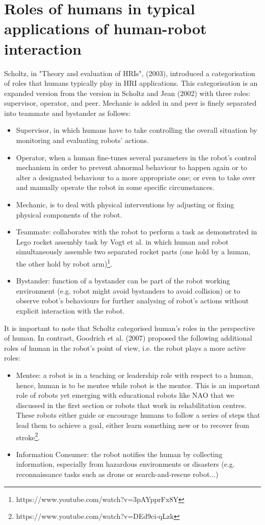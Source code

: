 \documentclass[10pt, a4paper]{article}
\begin{document}
\section{Roles of humans in typical applications of human-robot interaction}
Scholtz, in "Theory and evaluation of HRIs", (2003)\cite{scholtz2003theory}, introduced a categorisation of roles that humans typically play in HRI applications. This categorisation is an expanded version from the version in Scholtz and Jean (2002)\cite{scholtz2002human} with three roles:  supervisor, operator, and peer. Mechanic is added in and peer is finely separated into teammate and bystander as follows:
\begin{itemize}
	\item Supervisor, in which humans have to take controlling the overall situation by monitoring and evaluating robots' actions.
	\item Operator, when a human fine-tunes several parameters in the robot's control mechanism in order to prevent abnormal behaviour to happen again or to alter a designated behaviour to  a more appropriate one; or even to take over and manually operate the robot in some specific circumstances.
	\item Mechanic, is to deal with physical interventions by adjusting or fixing physical components of the robot.
	\item Teammate: collaborates with the robot to perform a task as demonstrated in Lego rocket assembly task by Vogt et al. in which human and robot simultaneously assemble two separated rocket parts (one hold by a human, the other hold by robot arm)\footnote{https://www.youtube.com/watch?v=3pAYpprFx8Y}.
	\item Bystander: function of a bystander can be part of the robot working environment (e.g. robot might avoid bystanders to avoid collision) or to observe robot's behaviours for further analysing of robot's actions without explicit interaction with the robot.
\end{itemize}

It is important to note that Scholtz categorised human's roles in the perspective of human. In contrast, Goodrich et al. (2007)\cite{goodrich2007human} proposed the following additional roles of human in the robot's point of view, i.e. the robot plays a more active roles:
\begin{itemize}
	\item Mentee: a robot is in a teaching or leadership role with respect to a human, hence, human is to be mentee while robot is the mentor. This is an important role of robots yet emerging with educational robots like NAO that we discussed in the first section or robots that work in rehabilitation centres. These robots either guide or encourage humans to follow a series of steps that lead them to achieve a goal, either learn something new or to recover from stroke\footnote{https://www.youtube.com/watch?v=DEd9ci-qLzk}.
	\item Information Consumer: the robot notifies the human by collecting information, especially from hazardous environments or disasters (e.g. reconnaissance tasks such as drone or search-and-rescue robot...)
\end{itemize}
\end{document}
